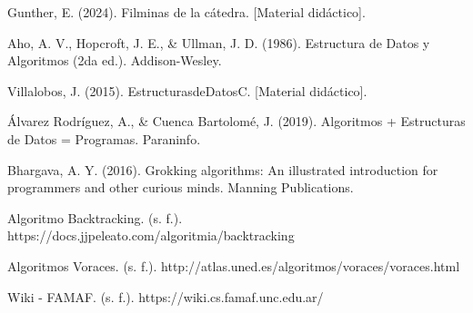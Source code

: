 \documentclass{scrreprt}
\begin{document}

\tableofcontents












\newpage
\begin{thebibliography}{9}

     Gunther, E. (2024). Filminas de la cátedra. [Material didáctico].
    
     Aho, A. V., Hopcroft, J. E., \& Ullman, J. D. (1986). Estructura de Datos y Algoritmos (2da ed.). Addison-Wesley.
    
     Villalobos, J. (2015). EstructurasdeDatosC. [Material didáctico].
    
     Álvarez Rodríguez, A., \& Cuenca Bartolomé, J. (2019). Algoritmos + Estructuras de Datos = Programas. Paraninfo.
    
     Bhargava, A. Y. (2016). Grokking algorithms: An illustrated introduction for programmers and other curious minds. Manning Publications.

     Algoritmo Backtracking. (s. f.). https://docs.jjpeleato.com/algoritmia/backtracking

     Algoritmos Voraces. (s. f.). http://atlas.uned.es/algoritmos/voraces/voraces.html

     Wiki - FAMAF. (s. f.). https://wiki.cs.famaf.unc.edu.ar/
    
\end{thebibliography}
\end{document}
